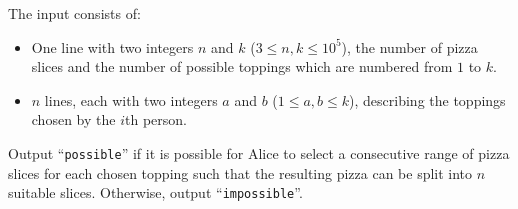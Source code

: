\begin{Input}
    The input consists of:
    \begin{itemize}
        \item One line with two integers $n$ and $k$ ($3\leq n, k \leq 10^5$), the number of pizza slices and the number of possible toppings which are numbered from $1$ to $k$.
        \item $n$ lines, each with two integers $a$ and $b$ ($1\leq a, b \leq k$), describing the toppings chosen by the $i$th person.
    \end{itemize}
\end{Input}

\begin{Output}
    Output ``\texttt{possible}'' if it is possible for Alice to select a
    consecutive range of pizza slices for each chosen topping such that the
    resulting pizza can be split into $n$ suitable slices.
    Otherwise, output ``\texttt{impossible}''.
\end{Output}
